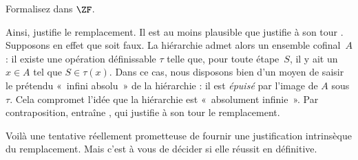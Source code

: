 \documentclass[../../../include/open-logic-section]{subfiles}
\begin{document}
\begin{prob}
	Formalisez \stagescofin{} dans $\ZF$.
\end{prob}

Ainsi, \stagescofin{} justifie le remplacement. Il est au moins
plausible que \stagesinex{} justifie à son tour \stagescofin.
Supposons en effet que \stagescofin{} soit faux. La hiérarchie
admet alors un ensemble cofinal~$A$ : il existe une opération définissable
$\tau$ telle que, pour toute étape~$S$, il y ait un $x \in A$
tel que $S \in \tau(x)$. Dans ce cas, nous disposons bien
d'un moyen de saisir le prétendu «~infini absolu~» de la
hiérarchie : il est \emph{épuisé} par l'image de $A$ sous
$\tau$. Cela compromet l'idée que la hiérarchie est
«~absolument infinie~». Par contraposition, \stagesinex{}
entraîne \stagescofin, qui justifie à son tour le remplacement.

Voilà une tentative réellement prometteuse de fournir une
justification intrinsèque du remplacement. Mais c'est à vous
de décider si elle réussit en définitive.
\end{document}
